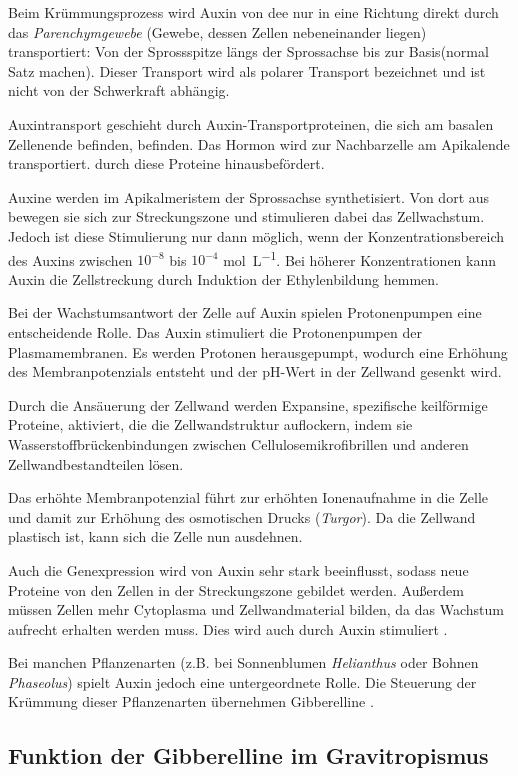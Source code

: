 \documentclass[
a4paper, 
11pt, 
ngerman,
listof=totoc,
bibliography=totocnumbered,
abstracton
]{scrreprt}
\begin{document}
Beim Krümmungsprozess wird Auxin von dee nur in eine Richtung direkt durch das \emph{Parenchymgewebe} (Gewebe, dessen Zellen nebeneinander liegen) transportiert: Von der Sprossspitze längs der Sprossachse bis zur Basis(normal Satz machen). Dieser Transport wird als polarer Transport bezeichnet und ist nicht von der Schwerkraft abhängig.

Auxintransport geschieht durch Auxin-Transportproteinen, die sich am basalen Zellenende befinden, befinden.
Das Hormon wird zur Nachbarzelle am Apikalende transportiert.  durch diese Proteine hinausbefördert.

Auxine werden im Apikalmeristem der Sprossachse synthetisiert. Von dort aus bewegen sie sich zur Streckungszone und stimulieren dabei das Zellwachstum.
Jedoch ist diese Stimulierung nur dann möglich, wenn der Konzentrationsbereich des Auxins zwischen $10^{-8}$ bis $10^{-4}$ \si{\mole\per\L}. Bei höherer Konzentrationen kann Auxin die Zellstreckung durch Induktion der Ethylenbildung hemmen.

Bei der Wachstumsantwort der Zelle auf Auxin spielen Protonenpumpen eine entscheidende Rolle. Das Auxin stimuliert die Protonenpumpen der Plasmamembranen. Es werden Protonen herausgepumpt, wodurch eine Erhöhung des Membranpotenzials entsteht und der pH-Wert in der Zellwand gesenkt wird. 

Durch die Ansäuerung  der Zellwand werden Expansine, spezifische keilförmige Proteine, aktiviert, die die Zellwandstruktur auflockern, indem sie Wasserstoffbrückenbindungen zwischen Cellulosemikrofibrillen und anderen Zellwandbestandteilen lösen.

Das erhöhte Membranpotenzial führt zur erhöhten Ionenaufnahme in die Zelle und damit zur Erhöhung des osmotischen Drucks (\emph{Turgor}). Da die Zellwand plastisch ist, kann sich die Zelle nun ausdehnen. 

Auch die Genexpression wird von Auxin sehr stark beeinflusst, sodass neue Proteine von den Zellen in der Streckungszone gebildet werden.
Außerdem müssen Zellen mehr Cytoplasma und Zellwandmaterial bilden, da das Wachstum aufrecht erhalten werden muss. Dies wird auch durch Auxin stimuliert \parencite[1118ff]{campbell}.

Bei manchen Pflanzenarten (z.B. bei Sonnenblumen \emph{Helianthus} oder Bohnen \emph{Phaseolus}) spielt Auxin jedoch eine untergeordnete Rolle.
Die Steuerung der Krümmung dieser Pflanzenarten übernehmen Gibberelline \parencite[502f]{Nultsch}.
 
\subsection{Funktion der Gibberelline im Gravitropismus}
\end{document}

